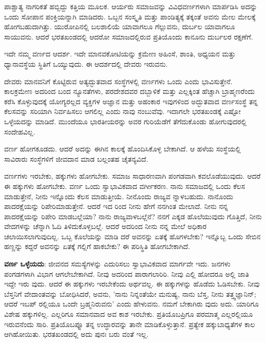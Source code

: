 ಪಾಶ್ಚಾತ್ಯ ನಾಗರಿಕತೆ ಹಬ್ಬಿದ್ದು ಕತ್ತಿಯ ಮೂಲಕ. ಆರ್ಯರು ಸಮಾಜವನ್ನು ವಿವಿಧವರ್ಣಗಳಾಗಿ ಮಾರ್ಪಡಿಸಿ ಅದನ್ನು ಒಂದು ಸೋಪಾನ ಪಂಕ್ತಿಯನ್ನಾಗಿ ಮಾಡಿದರು. ಒಬ್ಬನ ಸಂಸ್ಕೃತಿ ಮತ್ತು ಪಾಂಡಿತ್ಯಕ್ಕೆ ತಕ್ಕಂತೆ ಅವನು ಮೇಲ ಮೇಲಕ್ಕೆ ಹೋಗಬಹುದಾಗಿತ್ತು. ಯುರೋಪಿನಲ್ಲಿ ಬಲಶಾಲಿಯೆ ಯಾವಾಗಲೂ ಗೆಲ್ಲುವನು, ದುರ್ಬಲ ಯಾವಾಗಲೂ ಸಾಯುವನು. ಆದರೆ ಭರತಖಂಡದಲ್ಲಿ ಆದರೋ ಸಮಾಜದಲ್ಲಿರುವ ಪ್ರತಿಯೊಂದು ಕಾನೂನು ದುರ್ಬಲರ ರಕ್ಷಣೆಗೆ.

ಇದೇ ನಮ್ಮ ವರ್ಣದ ಆದರ್ಶ. ಇದೇ ಮಾನವಕೋಟಿಯನ್ನು ಕ್ರಮೇಣ ಅಹಿಂಸೆ, ಶಾಂತಿ, ಅಧ್ಯಯನ ಮತ್ತು ಧ್ಯಾನಾವಸ್ಥೆಯ ಸ್ಥಿತಿಗೆ ಒಯ್ಯುವುದು. ಈ ಆದರ್ಶದಲ್ಲಿ ದೇವರು ಇರುವನು.

ದೇವರು ಮಾನವನಿಗೆ ಕೊಟ್ಟಿರುವ ಅತ್ಯದ್ಭುತವಾದ ಸಂಸ್ಥೆಗಳಲ್ಲಿ ವರ್ಣಗಳು ಒಂದು ಎಂದು ಭಾವಿಸುತ್ತೇನೆ. ಕಾಲಕ್ರಮೇಣ ಅದರಿಂದ ಬಂದ ನ್ಯೂನತೆಗಳು, ಪರದೇಶದವರ ದಬ್ಬಾಳಿಕೆ ಮತ್ತು ಎಲ್ಲಕ್ಕಿಂತ ಹೆಚ್ಚಾಗಿ ಬ್ರಾಹ್ಮಣರೆಂದು ಕರೆಸಿ ಕೊಳ್ಳುವುದಕ್ಕೆ ಯೋಗ್ಯರಲ್ಲದ ವ್ಯಕ್ತಿಗಳ ಅಜ್ಞಾನ ಮತ್ತು ಅಹಂಕಾರ ಇವುಗಳಿಂದ ಅದ್ಭುತವಾದ ವರ್ಣಸಂಸ್ಥೆ ತನ್ನ ಕೆಲಸವನ್ನು ಸರಿಯಾಗಿ ನಿರ್ವಹಿಸಲು ಆಗಲಿಲ್ಲ ಎಂದು ನಾವು ನಂಬುವೆವು. ಇದಾಗಲೇ ಭರತಖಂಡಕ್ಕೆ ಎಷ್ಟೋ ಒಳ್ಳೆಯದನ್ನು ಮಾಡಿದೆ. ಮುಂದೆಯೂ ಭಾರತೀಯರನ್ನು ಅವರ ಗುರಿಯೆಡೆಗೆ ತೆಗೆದುಕೊಂಡು ಹೋಗುವುದರಲ್ಲಿ ಸಂದೇಹವಿಲ್ಲ.

ವರ್ಣ ಹೋಗಕೂಡದು. ಆದರೆ ಅದನ್ನು ಈಗಿನ ಕಾಲಕ್ಕೆ ಹೊಂದಿಸಿಕೊಳ್ಳ ಬೇಕಾಗಿದೆ. ಆ ಹಳೆಯ ಸಂಸ್ಥೆಯಲ್ಲಿ ಸಾವಿರಾರು ಸಂಸ್ಥೆಗಳಿಗೆ ಜೀವದಾನ ಮಾಡ ಬಲ್ಲಂತಹ ಚೈತನ್ಯವಿದೆ.

ವರ್ಣಗಳು ಇರಬೇಕು, ಹಕ್ಕುಗಳು ಹೋಗಬೇಕು. ಸಮಾಜ ಸಾಧಾರಣವಾಗಿ ಪಂಗಡವಾಗಿ ಕವಲೊಡೆಯುವುದು. ಆದರೆ ಈ ಹಕ್ಕುಗಳು ಹೋಗಬೇಕು. ವರ್ಣ ಒಂದು ಸ್ವಾಭಾವಿಕವಾದ ವರ್ಗೀಕರಣ. ನಾನು ಸಮಾಜದಲ್ಲಿ ಒಂದು ಕೆಲಸ ಮಾಡುತ್ತೇನೆ, ನೀನು ಇನ್ನೊಂದು ಕೆಲಸ ಮಾಡುತ್ತೀಯೆ. ನೀನೊಂದು ರಾಜ್ಯವ ನ್ನಾಳಬಹುದು. ನಾನೊಂದು ಪಾದರಕ್ಷೆಯನ್ನು ರಿಪೇರಿಮಾಡುತ್ತೇನೆ. ಆದರೆ ಇದ ರಿಂದ ನೀನು ಹೇಗೆ ನನಗಿಂತ ಮೇಲಾದೆ. ನೀನು ನನ್ನ ಪಾದರಕ್ಷೆಯನ್ನು ರಿಪೇರಿ ಮಾಡಬಲ್ಲೆಯಾ? ನಾನು ರಾಜ್ಯವಾಳಬಲ್ಲೆನೆ? ನನಗೆ ಎಕ್ಕಡ ಹೊಲೆಯುವುದು ಗೊತ್ತಿದೆ, ನೀನು ವೇದಗಳನ್ನು ಚೆನ್ನಾಗಿ ಓದಿ ತಿಳಿದುಕೊಳ್ಳಬಲ್ಲೆ. ಆದರೆ ಅದರಿಂದ ನೀನು ನನ್ನ ಮೇಲೆ ಅಧಿಕಾರ ಚಲಾಯಿಸಲಾಗುವುದಿಲ್ಲ. ಒಬ್ಬ ಕೊಲೆಯನ್ನು ಮಾಡಿ ದರೆ ಅವನನ್ನು ಏತಕ್ಕೆ ಹೊಗಳಬೇಕು? ಇನ್ನೊಬ್ಬ ಒಂದು ಸೇಬಿನ ಹಣ್ಣನ್ನು ಕದ್ದರೆ ಅವನನ್ನು ಏತಕ್ಕೆ ಗಲ್ಲಿಗೆ ಹಾಕಬೇಕು? ಈ ಪರಿಸ್ಥಿತಿ ಹೋಗಬೇಕಾಗಿದೆ.

\textbf{ವರ್ಣ ಒಳ್ಳೆಯದು}: ಜೀವನದ ಸಮಸ್ಯೆಗಳನ್ನು ಎದುರಿಸಲು ಸ್ವಾಭಾವಿಕವಾದ ಮಾರ್ಗವೇ ಇದು. ಜನಗಳು ಪಂಗಡಗಳಾಗಿ ವಿಭಾಗ ಆಗಲೇಬೇಕಾಗಿದೆ. ನೀವು ಅದರಿಂದ ಪಾರಾಗಲಾರಿರಿ. ನೀವು ಎಲ್ಲಿ ಹೋದರೂ ಅಲ್ಲಿ ಜಾತಿ ಇದ್ದೇ ಇರು ವುದು. ಆದರೆ ಈ ಹಕ್ಕುಗಳು ಇರಬೇಕೆಂದು ಅರ್ಥವಲ್ಲ. ಈ ಹಕ್ಕುಗಳನ್ನು ಹೊಡೆದು ಓಡಿಸಬೇಕು. ನೀವು ಬೆಸ್ತನಿಗೆ ವೇದಾಂತವನ್ನು ಬೋಧಿಸಿದರೆ, ಅವನು, 'ನಾನು ನಿನ್ನಂತೆಯೇ ಮನುಷ್ಯ, ನಾನು ಬೆಸ್ತ, ನೀನು ತತ್ತ್ವಜ್ಞಾನಿನ್; ಆದರೆ ಇಬಪ್ ರಲ್ಲಿಯೂ ಒಂದೇ ಬ್ರಹ್ಮನಿರುವನು' ಎಂದು ಹೇಳುವನು. ನಮಗೆ ಬೇಕಾಗಿರು ವುದು ಅದು. ಯಾರಿಗೂ ವಿಶೇಷ ಹಕ್ಕುಗಳಿಲ್ಲ. ಎಲ್ಲರಿಗೂ ಸಮಾನವಾದ ಅವ ಕಾಶ ಇರಬೇಕು. ಪ್ರತಿಯೊಬಪ್ರಿಗೂ ಪರಮಾತ್ಮ ಎಲ್ಲರಲ್ಲಿಯೂ ಇರುವನೆಂದು ಸಾರಿ. ಪ್ರತಿಯೊಬಪ್ನೂ ತನ್ನ ಉದ್ಧಾರವನ್ನು ತಾನೇ ಮಾಡಿಕೊಳ್ಳುತ್ತಾನೆ. ಪ್ರತ್ಯೇಕ ಹಕ್ಕುಬಾಧ್ಯತೆಗಳ ಕಾಲ ಆಗಿಹೋಯಿತು. ಭರತಖಂಡದಲ್ಲಿ ಅದು ಪುನಃ ಬರು ವಂತೆ ಇಲ್ಲ.


